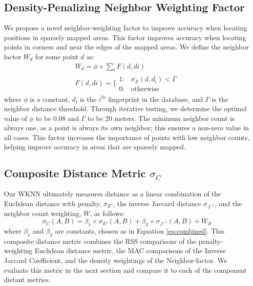 \documentclass[conference]{IEEEtran}
\begin{document}
\subsection{Density-Penalizing Neighbor Weighting Factor}\label{subsec:density_penalizing_neighbor_weighting}
\indent We propose a novel neighbor-weighting factor to improve accuracy when locating positions in sparsely mapped areas. This factor improves accuracy when locating points in corners and near the edges of the mapped areas. We define the neighbor factor $W_d$ for some point $d$ as:
\begin{equation}
\label{eq:density}
\begin{split}
W_d=\phi\times\sum\limits_{i}F(d,di)\\
F(d,di)=\{\begin{array}{lr}
       1: &  \sigma_E(d, d_i) < \Gamma \\
       0: &  \text{otherwise}
\end{array}
\end{split}
\end{equation}
where $\phi$ is a constant, $d_i$ is the $i^{th}$ fingerprint in the database, and $\Gamma$ is the neighbor distance threshold. Through iterative testing, we determine the optimal value of $\phi$ to be 0.08 and $\Gamma$ to be 20 meters. The minimum neighbor count is always one, as a point is always its own neighbor; this ensures a non-zero value in all cases. This factor increases the importance of points with low neighbor counts, helping improve accuracy in areas that are sparsely mapped. 

\subsection{Composite Distance Metric $\sigma_C$}
\indent Our WKNN ultimately measures distance as a linear combination of the Euclidean distance with penalty, $\sigma_{E'}$,  the inverse Jaccard distance $\sigma_{J^{-1}}$, and the neighbor count weighting, $W$, as follows:
\begin{equation}
\label{eq:composite}
\sigma_C(A, B)=\beta_1\times\sigma_{E'}(A, B)+\beta_2\times\sigma_{J^{-1}}(A, B)+W_B
\end{equation}
where $\beta_1$ and $\beta_2$ are constants, chosen as in Equation \ref{eq:combined}. This composite distance metric combines the RSS comparisons of the penalty-weighting Euclidean distance metric, the MAC comparisons of the Inverse Jaccard Coefficient, and the density weightings of the Neighbor-factor. We evaluate this metric in the next section and compare it to each of the component distant metrics.
\end{document}
